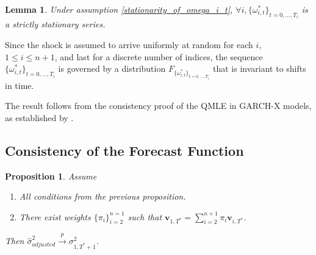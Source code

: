 \documentclass[11pt,3p,review,authoryear]{elsarticle}
\newcommand{\weight}{\pi}
\newtheorem{lem}{Lemma}
\newtheorem{prop}{Proposition}
\theoremstyle{definition}
\newenvironment{proof-of-proposition}[1][{}]{\noindent{\bf
    Proof of Proposition {#1}}
  \hspace*{.5em}}{\qed\bigskip\\}
\newenvironment{proof-of-lemma}[1][{}]{\noindent{\bf
Proof of Lemma {#1}}
\hspace*{.5em}}{\qed\bigskip\\}
\begin{document}
\begin{lem}
  Under assumption \ref{stationarity_of_omega_i_t}, $\forall i, \{\omega_{i,t}^{*}\}_{t=0,...,T_i}$ is a strictly stationary series.
\end{lem}

\begin{proof-of-lemma}
Since the shock is assumed to arrive uniformly at random for each $i$, $1 \leq i \leq n + 1$, and last for a discrete number of indices, the sequence $\{\omega_{i,t}^{*}\}_{t=0,...,T_i}$ is governed by a distribution $F_{\{\omega_{i,t}^{*}\}_{t=0,...,T_i}}$ that is invariant to shifts in time.
\end{proof-of-lemma}

\begin{proof-of-proposition}
The result follows from the consistency proof of the QMLE in GARCH-X models, as established by \citet{han2014asymptotic}. 
\end{proof-of-proposition}

  \subsection{Consistency of the Forecast Function}
  \begin{prop}\label{sigma_consistency}
    Assume
    \begin{enumerate}
      \item All conditions from the previous proposition.
      \item There exist weights $\{\pi_{i}\}_{i=2}^{n=1}$ such that $\textbf{v}_{1,T^{*}} = \sum^{n+1}_{i=2}\weight_{i} \textbf{v}_{i,T^{*}}$.
     \end{enumerate}
  Then $\hat\sigma^{2}_{adjusted}\xrightarrow{p}\sigma^{2}_{1,T^{*}+1}$. 
  \end{prop}
\end{document}
